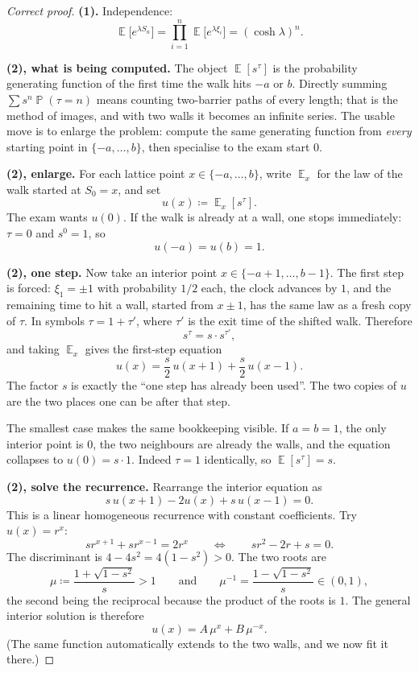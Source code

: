 \documentclass[11pt,a4paper]{article}
\DeclareMathOperator{\E}{\mathbb{E}}
\DeclareMathOperator{\Pbb}{\mathbb{P}}
\begin{document}
\begin{proof}[Correct proof]
\textbf{(1).}
Independence:
\[
\E\bigl[e^{\lambda S_n}\bigr]
=
\prod_{i=1}^{n}\E\bigl[e^{\lambda\xi_i}\bigr]
=
(\cosh\lambda)^{n}.
\]

\textbf{(2), what is being computed.}
The object \( \E[s^{\tau}] \) is the probability generating function of the first time the walk hits \( -a \) or \( b \). Directly summing \( \sum s^{n}\Pbb(\tau=n) \) means counting two-barrier paths of every length; that is the method of images, and with two walls it becomes an infinite series. The usable move is to enlarge the problem: compute the same generating function from \emph{every} starting point in \( \{-a,\dots,b\} \), then specialise to the exam start \( 0 \).

\textbf{(2), enlarge.}
For each lattice point \( x\in\{-a,\dots,b\} \), write \( \E_x \) for the law of the walk started at \( S_0=x \), and set
\[
u(x)
\coloneqq
\E_x[s^{\tau}].
\]
The exam wants \( u(0) \). If the walk is already at a wall, one stops immediately: \( \tau=0 \) and \( s^{0}=1 \), so
\[
u(-a)
=
u(b)
=
1.
\]

\textbf{(2), one step.}
Now take an interior point \( x\in\{-a+1,\dots,b-1\} \). The first step is forced: \( \xi_1=\pm 1 \) with probability \( 1/2 \) each, the clock advances by \( 1 \), and the remaining time to hit a wall, started from \( x\pm 1 \), has the same law as a fresh copy of \( \tau \). In symbols \( \tau=1+\tau' \), where \( \tau' \) is the exit time of the shifted walk. Therefore
\[
s^{\tau}
=
s\cdot s^{\tau'},
\]
and taking \( \E_x \) gives the first-step equation
\[
u(x)
=
\frac{s}{2}\,u(x+1)
+
\frac{s}{2}\,u(x-1).
\]
The factor \( s \) is exactly the ``one step has already been used''. The two copies of \( u \) are the two places one can be after that step.

The smallest case makes the same bookkeeping visible. If \( a=b=1 \), the only interior point is \( 0 \), the two neighbours are already the walls, and the equation collapses to \( u(0)=s\cdot 1 \). Indeed \( \tau=1 \) identically, so \( \E[s^{\tau}]=s \).

\textbf{(2), solve the recurrence.}
Rearrange the interior equation as
\[
s\,u(x+1)
-
2u(x)
+
s\,u(x-1)
=
0.
\]
This is a linear homogeneous recurrence with constant coefficients. Try \( u(x)=r^{x} \):
\[
s r^{x+1}+s r^{x-1}
=
2r^{x}
\qquad\Longleftrightarrow\qquad
s r^{2}-2r+s
=
0.
\]
The discriminant is \( 4-4s^{2}=4(1-s^{2})>0 \). The two roots are
\[
\mu
\coloneqq
\frac{1+\sqrt{1-s^{2}}}{s}
>
1
\qquad\text{and}\qquad
\mu^{-1}
=
\frac{1-\sqrt{1-s^{2}}}{s}
\in
(0,1),
\]
the second being the reciprocal because the product of the roots is \( 1 \). The general interior solution is therefore
\[
u(x)
=
A\,\mu^{x}
+
B\,\mu^{-x}.
\]
(The same function automatically extends to the two walls, and we now fit it there.)


\end{proof}
\end{document}
